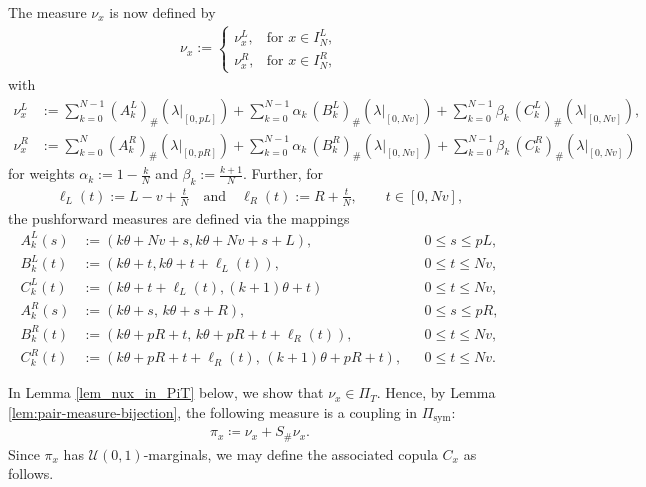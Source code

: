 \documentclass{article}
\newcommand{\lam}{\lambda}
\newcommand{\cU}{\mathcal{U}}
\begin{document}
The measure \(\nu_x\) is now defined by
\begin{align}\label{def_nu_x}
    \nu_x := \begin{cases}
        \nu_x^L, &\text{for } x\in I_N^L,\\
        \nu_x^R, &\text{for } x\in I_N^R,
    \end{cases}
\end{align}
with
\begin{align}\label{def_nu_xL}
    \nu_x^L&:= \sum_{k=0}^{N-1} (A_k^L)_\#(\lam\vert_{[0,pL]}) + \sum_{k=0}^{N-1} \alpha_k\, (B_k^L)_\#(\lam\vert_{[0,Nv]}) + \sum_{k=0}^{N-1} \beta_k\, (C_k^L)_\#(\lam\vert_{[0,Nv]}),\\
    \label{def_nu_xR} \nu_x^R&:= \sum_{k=0}^{N} (A_k^R)_\#(\lam\vert_{[0,pR]}) + \sum_{k=0}^{N-1} \alpha_k\, (B_k^R)_\#(\lam\vert_{[0,Nv]}) + \sum_{k=0}^{N-1} \beta_k\, (C_k^R)_\#(\lam\vert_{[0,Nv]})
\end{align}
for weights \(\alpha_k := 1 - \frac k N\) and \(\beta_k:= \frac{k+1}{N}\).
Further, for
\begin{align}
    \ell_L(t):= L-v+\frac t N \quad \text{and} \quad \ell_R(t):= R + \frac t N, \qquad  t\in [0,Nv],
\end{align}
the pushforward measures are defined via the mappings
\begin{align}
    \label{def:A_kL} A_k^L(s) &:= \left(k\theta + Nv + s, k\theta + Nv + s + L\right), & & 0\leq s \leq pL,\\
    B_k^L(t) &:= \left(k\theta + t, k\theta + t + \ell_L(t)\right),  &&  0 \leq t \leq Nv,\\
    C_k^L(t) &:= \left(k\theta + t + \ell_L(t), (k+1) \theta + t\right) &&  0 \leq t \leq Nv,\\
    \label{def:A_kR} A_k^R(s)
    &:=
    \left(
        k\theta+s,\,
        k\theta+s+R
    \right),
    && 0\leq s \leq pR,\\
    B_k^R(t)
    &:=
    \left(
        k\theta+pR+t,\,
        k\theta+pR+t+\ell_R(t)
    \right),
    && 0 \leq t \leq Nv,\\
    \label{def:C_kR} C_k^R(t)
    &:=
    \left(
        k\theta+pR+t+\ell_R(t),\,
        (k+1)\theta+pR+t
    \right),
    && 0 \leq t \leq Nv.
\end{align}

In Lemma \ref{lem_nux_in_PiT} below, we show that \(\nu_x\in \Pi_T\).
Hence, by Lemma \ref{lem:pair-measure-bijection}, the following measure is a coupling in \(\Pi_{\operatorname{sym}}\):
\begin{align}\label{def:pi_x}
        \pi_x \coloneqq \nu_x + S_\# \nu_x.
    \end{align}
Since \(\pi_x\) has \(\cU(0,1)\)-marginals, we may define the associated copula \(C_x\) as follows.
\end{document}
